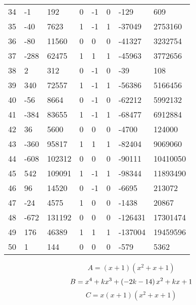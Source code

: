 \documentclass{amsart}
\begin{document}
\begin{longtable}{|l|l|l|lllll|}
34&-1&192&0&-1&0&-129&609\\
35&-40&7623&1&-1&1&-37049&2753160\\
36&-80&11560&0&0&0&-41327&3232754\\
37&-288&62475&1&1&1&-45963&3772656\\
38&2&312&0&-1&0&-39&108\\
39&340&72557&1&-1&1&-56386&5166456\\
40&-56&8664&0&-1&0&-62212&5992132\\
41&-384&83655&1&-1&1&-68477&6912884\\
42&36&5600&0&0&0&-4700&124000\\
43&-360&95817&1&1&1&-82404&9069060\\
44&-608&102312&0&0&0&-90111&10410050\\
45&542&109091&1&-1&1&-98344&11893490\\
46&96&14520&0&-1&0&-6695&213072\\
47&-24&4575&1&0&0&-1438&20867\\
48&-672&131192&0&0&0&-126431&17301474\\
49&176&46389&1&1&1&-137004&19459596\\
50&1&144&0&0&0&-579&5362\\
\hline
\end{longtable}
$$A=(x
 + 1)(x^2
 + x
 + 1)$$
$$B=x^4
 + k\*x^3
 + \left(-2\*k
 - 14\right) \*x^2
 + k\*x
 + 1$$
$$C=x(x
 + 1)(x^2
 + x
 + 1)$$
\end{document}
